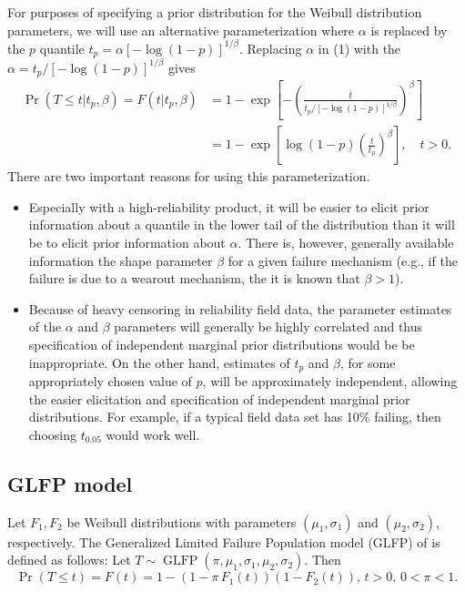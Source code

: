 \documentclass[aap]{imsart}
\newcommand{\op}{\operatorname}
\begin{document}
For purposes of specifying a prior distribution for the Weibull
distribution parameters, we will use an alternative parameterization
where $\alpha$ is replaced by the $p$ quantile $t_{p}=\alpha \left
[-\log(1-p)\right ]^{1/\beta}$. Replacing $\alpha$ in (1) with the
$\alpha=t_{p}/[-\log(1-p)]^{1/\beta}$ gives
\begin{align*}
\nonumber
\Pr(T \leq t|t_{p},\beta ) = F(t|t_{p},\beta)&=1-
\exp \left [-\left (\frac{t}{t_{p}/[-\log(1-p)]^{1/\beta}} \right )^{\beta}
\right ]\\
\label{equation:reparameterized.weibull.cdf}
&=1 - \exp\left[\log(1-p)\left(\frac{t}{t_{p}}\right)^{\beta}\right], \quad t > 0.
\end{align*}
There are two important reasons for using this parameterization.
\begin{itemize}
\item
Especially with a high-reliability product, it will be easier to
elicit prior information about a quantile in the lower tail of the
distribution than it will be to elicit prior information about
$\alpha$. There is, however, generally available
information the shape parameter $\beta$ for a given failure
mechanism (e.g., if the failure is due to a wearout mechanism, the
it is known that $\beta>1$). 
\item
Because of heavy censoring in reliability field data, the parameter
estimates of the $\alpha$ and $\beta$ parameters will generally be
highly correlated and thus specification of independent marginal
prior distributions would be be inappropriate. On the other hand,
estimates of $t_{p}$ and $\beta$, for some appropriately chosen
value of $p$, will be approximately independent, allowing the easier
elicitation and specification of independent marginal prior
distributions. For example, if a typical field data set has 10\%
failing, then choosing $t_{0.05}$ would 
work well.
\end{itemize}

\subsection{GLFP model}
\label{subsec:GLFP model}
Let $F_1,F_2$ be Weibull distributions with parameters $(\mu_1,\sigma_1)$ and $(\mu_2, \sigma_2)$, respectively.
The Generalized Limited Failure Population model (GLFP) of \citet{chan} is defined as follows: Let $T \sim \op{GLFP}(\pi, \mu_1,\sigma_1,\mu_2,\sigma_2)$. Then
$$\Pr(T \le t) = F(t) = 1 - (1-\pi\, F_{1}(t))(1 - F_{2}(t)),\, t>0,\, 0 < \pi < 1.$$
\end{document}
